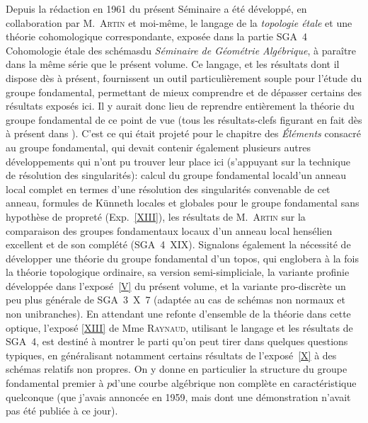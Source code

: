 Depuis la r\'edaction en 1961 du pr\'esent S\'eminaire a
\'et\'e d\'evelopp\'e, en collaboration par M.\, \textsc{Artin} et
moi-m\^eme, le langage de la \emph{topologie étale} et une
th\'eorie cohomologique correspondante, expos\'ee dans la partie
SGA~4 \og Cohomologie \'etale des sch\'emas\fg du \emph{Séminaire
de Géométrie Algébrique}, \`a para\^itre dans la
m\^eme s\'erie que le pr\'esent volume. Ce langage, et les
r\'esultats dont il dispose d\`es \`a pr\'esent, fournissent
un outil particuli\`erement souple pour l'\'etude du groupe
fondamental, permettant de mieux comprendre et de d\'epasser
certains des r\'esultats expos\'es ici. Il y aurait donc lieu de
reprendre enti\`erement la th\'eorie du groupe fondamental de ce
point de vue (tous les r\'esultats-clefs figurant en fait d\`es
\`a pr\'esent dans \loccit). C'est ce qui \'etait projet\'e
pour le chapitre des \emph{Éléments} consacr\'e au groupe
fondamental, qui devait contenir \'egalement plusieurs autres
d\'eveloppements qui n'ont pu trouver leur place ici (s'appuyant sur
la technique de r\'esolution des singularit\'es): calcul du
\og groupe fondamental local\fg d'un anneau local complet en termes d'une
r\'esolution des singularit\'es convenable de cet anneau, formules
de K\"unneth locales et globales pour le groupe fondamental sans
hypoth\`ese de propret\'e (\cf Exp.\, \ref{XIII}), les r\'esultats de
M.\, \textsc{Artin} sur la comparaison des groupes fondamentaux locaux d'un
anneau local hens\'elien excellent et de son compl\'et\'e
(SGA~4~XIX). Signalons \'egalement la n\'ecessit\'e de
d\'evelopper une th\'eorie du groupe fondamental d'un topos, qui
englobera \`a la fois la th\'eorie topologique ordinaire, sa
version semi-simpliciale, la variante \og profinie\fg
 d\'evelopp\'ee
dans l'expos\'e~\ref{V} du pr\'esent volume, et la variante
pro-discr\`ete un peu plus g\'en\'erale de SGA~3~X~7
(adapt\'ee au cas de sch\'emas non normaux et non unibranches). En
attendant une refonte d'ensemble de la th\'eorie dans cette optique,
l'expos\'e \ref{XIII} de Mme \textsc{Raynaud}, utilisant le langage et les
r\'esultats de SGA~4, est destin\'e \`a montrer le parti qu'on
peut tirer dans quelques questions typiques, en g\'en\'eralisant
notamment certains r\'esultats de l'expos\'e~\ref{X} \`a des
sch\'emas relatifs non propres. On y donne en particulier la
structure du groupe fondamental \og premier \`a $p$\fg d'une courbe
alg\'ebrique non compl\`ete en
caract\'eristique
quelconque (que j'avais
annonc\'ee
en 1959, mais dont une d\'emonstration n'avait pas
\'et\'e publi\'ee \`a ce jour).

